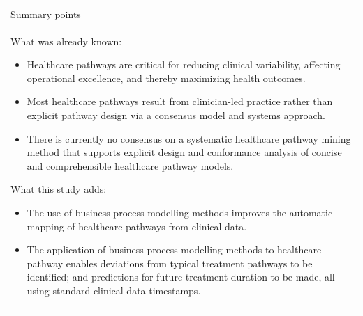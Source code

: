 \begin{table}[h]
\centering
\begin{tabular}{p{11cm}} 
 Summary points\\ 
 What was already known:
 \begin{itemize}
     \item Healthcare pathways are critical for reducing clinical variability, affecting operational excellence, and thereby maximizing health outcomes.
     \item  Most healthcare pathways result from clinician-led practice rather than explicit pathway design via a consensus model and systems approach. 
     \item  There is currently no consensus on a systematic healthcare pathway mining method that supports explicit design and conformance analysis of concise and comprehensible healthcare pathway models.
 \end{itemize}
 What this study adds:
 \begin{itemize}
     \item  The use of business process modelling methods improves the automatic mapping of healthcare pathways from clinical data.
     \item The application of business process modelling methods to healthcare pathway enables deviations from typical treatment pathways to be identified; and predictions for future treatment duration to be made, all using standard clinical data timestamps. 
 \end{itemize}
\end{tabular}
\end{table}
